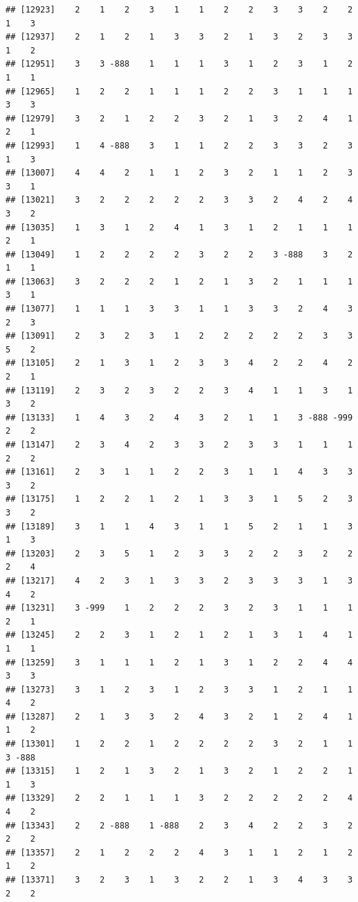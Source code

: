 \documentclass[
  12pt,
  openany]{book}
\begin{document}
\begin{verbatim}
## [12923]    2    1    2    3    1    1    2    2    3    3    2    2    1    3
## [12937]    2    1    2    1    3    3    2    1    3    2    3    3    1    2
## [12951]    3    3 -888    1    1    1    3    1    2    3    1    2    1    1
## [12965]    1    2    2    1    1    1    2    2    3    1    1    1    3    3
## [12979]    3    2    1    2    2    3    2    1    3    2    4    1    2    1
## [12993]    1    4 -888    3    1    1    2    2    3    3    2    3    1    3
## [13007]    4    4    2    1    1    2    3    2    1    1    2    3    3    1
## [13021]    3    2    2    2    2    2    3    3    2    4    2    4    3    2
## [13035]    1    3    1    2    4    1    3    1    2    1    1    1    2    1
## [13049]    1    2    2    2    2    3    2    2    3 -888    3    2    1    1
## [13063]    3    2    2    2    1    2    1    3    2    1    1    1    3    1
## [13077]    1    1    1    3    3    1    1    3    3    2    4    3    2    3
## [13091]    2    3    2    3    1    2    2    2    2    2    3    3    5    2
## [13105]    2    1    3    1    2    3    3    4    2    2    4    2    2    1
## [13119]    2    3    2    3    2    2    3    4    1    1    3    1    3    2
## [13133]    1    4    3    2    4    3    2    1    1    3 -888 -999    2    2
## [13147]    2    3    4    2    3    3    2    3    3    1    1    1    2    2
## [13161]    2    3    1    1    2    2    3    1    1    4    3    3    3    2
## [13175]    1    2    2    1    2    1    3    3    1    5    2    3    3    2
## [13189]    3    1    1    4    3    1    1    5    2    1    1    3    1    3
## [13203]    2    3    5    1    2    3    3    2    2    3    2    2    2    4
## [13217]    4    2    3    1    3    3    2    3    3    3    1    3    4    2
## [13231]    3 -999    1    2    2    2    3    2    3    1    1    1    2    1
## [13245]    2    2    3    1    2    1    2    1    3    1    4    1    1    1
## [13259]    3    1    1    1    2    1    3    1    2    2    4    4    3    3
## [13273]    3    1    2    3    1    2    3    3    1    2    1    1    4    2
## [13287]    2    1    3    3    2    4    3    2    1    2    4    1    1    2
## [13301]    1    2    2    1    2    2    2    2    3    2    1    1    3 -888
## [13315]    1    2    1    3    2    1    3    2    1    2    2    1    1    3
## [13329]    2    2    1    1    1    3    2    2    2    2    2    4    4    2
## [13343]    2    2 -888    1 -888    2    3    4    2    2    3    2    2    2
## [13357]    2    1    2    2    2    4    3    1    1    2    1    2    1    2
## [13371]    3    2    3    1    3    2    2    1    3    4    3    3    2    2

\end{verbatim}
\end{document}
